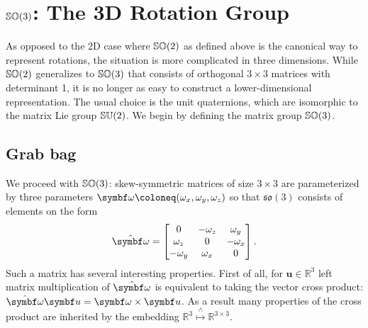 \chapter{\texorpdfstring{${\mathbb{SO}(3)}$}{SO(3)}: The 3D Rotation Group}


As opposed to the 2D case where ${\mathbb{SO}(2)}$ as defined above is the canonical way to represent rotations, the situation is more complicated in three dimensions. While ${\mathbb{SO}(2)}$ generalizes to ${\mathbb{SO}(3)}$ that consists of orthogonal $3 \times 3$ matrices with determinant 1, it is no longer as easy to construct a lower-dimensional representation. The usual choice is the unit quaternions, which are isomorphic to the matrix Lie group ${\mathbb{SU}(2)}$. We begin by defining the matrix group ${\mathbb{SO}(3)}$.


\section{Grab bag}

We proceed with ${\mathbb{SO}(3)}$: skew-symmetric matrices of size $3 \times 3$ are parameterized by three parameters $\bomega  \coloneq (\omega_x, \omega_y, \omega_z)$ so that $\mathfrak{so}(3)$ consists of elements on the form
\begin{equation}
  \hat {\bomega} = \begin{bmatrix} 0 & -\omega_z & \omega_y \\ \omega_z & 0 & -\omega_x \\ -\omega_y & \omega_x & 0	\end{bmatrix}.
\end{equation}
Such a matrix has several interesting properties. First of all, for $\symbf u \in \mathbb{R}^3$ left matrix multiplication of $\hat {\bomega}$ is equivalent to taking the vector cross product: $\hat {\bomega} \symbf u = \bomega \times \symbf u$.
As a result many properties of the cross product are inherited by the embedding $\mathbb{R}^3 \overset{\wedge}\mapsto \mathbb{R}^{3 \times 3}$.

